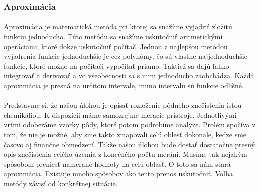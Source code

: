 \documentclass[12pt]{article}
\begin{document}
\subsubsection{Aproximácia}
\paragraph{}
Aproximácia je matematická metóda pri ktorej sa snažíme vyjadriť zložitú funkciu jednoducho. Túto metódu sa snažíme uskutočniť aritmetickými operáciami, ktoré dokze uskutočniť počítač.
Jednou z najlepšou metódou vyjadrenia funkcie jednoduchšie je cez polynómy, čo sú vlastne najjednoduchšie funkcie, ktoré možno na počítači vypočítať priamo. Taktiež sa dajú ľahko integrovať a derivovať a vo všeobecnosti sa s nimi jednoducho zaobchádza.
Každá aproximácia je presná na určitom intervale, mimo intervalu sú funkcie odlišné.
\cite{aproximacia}
\paragraph{}
Predstavme si, že našou úlohou je opísať rozloženie pôdneho znečistenia istou chemikáliou. K dispozícii máme samozrejme meracie prístroje. Jednotlivými vrtmi odoberáme vzorky pôdy, ktoré potom podrobíme analýze.
Prolém spočíva v tom, že nie je možné, aby sme takto zmapovali celú oblesť dokonale, keďze sme časovo aj finančne obmedzení. Takže našou úlohou bude dostať dostatočne presný opis znečistenia celého územia z konečného počtu meráni.
Musíme tak nejakým spôsobom preniesť namerané hodnoty na celú oblasť. O toto sa nám stará aproximácia. Existuje mnoho spôsobov ako tento prenos uskutočniť. Voľba metódy závisí od konkrétnej situácie.
\cite{num_metody}
\end{document}
